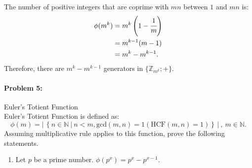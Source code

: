 \documentclass[12pt]{scrartcl}
\begin{document}
{{\begin{spacing}{1.5}
\begin{enumerate}[label=(\alph*)]
{\begin{minipage}{35.4em}
The number of positive integers that are coprime with $mn$ between $1$ and $mn$ is:\vspace{-0.5em}
\begin{align*}
\phi(m^{k}) &= m^{k}\left(1-\cfrac{1}{m}\right)\\
&= m^{k-1}(m-1)\\
&= m^{k} - m^{k-1}.
\end{align*}
Therefore, there are $m^k-m^{k-1}$ generators in $\{\mathbb{Z}_{m^k}; +\}$.
\vspace{0.3em} 
	\end{minipage}}

\end{enumerate}
\end{spacing}


\paragraph*{Problem 5: }Euler's Totient Function\\

\noindent Euler's Totient Function is defined as:
$$\phi(m) = \big|\hspace{2pt}\left\{n \in \mathbb{N} ~ | ~ n < m, \text{gcd}(m,n) = 1 \left(\text{HCF}(m,n) = 1\right)\right\}\hspace{2pt}\big|~,~ m\in \mathbb{N}.$$
Assuming multiplicative rule applies to this function, prove the following statements.

\begin{enumerate}[label=(\alph*)]
\item Let $p$ be a prime number. $\phi(p^x) = p^x-p^{x-1}.$


\end{enumerate}}}
\end{document}
